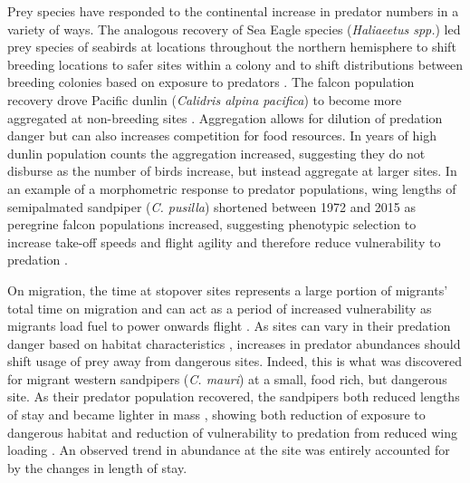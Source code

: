 Prey species have responded to the continental increase in predator numbers in a variety of ways. The analogous recovery of Sea Eagle species (\textit{Haliaeetus spp.}) led prey species of seabirds at locations throughout the northern hemisphere to shift breeding locations to safer sites within a colony and to shift distributions between breeding colonies based on exposure to predators \citep{MarkHipfner2012}. The falcon population recovery drove Pacific dunlin (\textit{Calidris alpina pacifica}) to become more aggregated at non-breeding sites \citep{Xu2015b,Ydenberg2017}. Aggregation allows for dilution of predation danger but can also increases competition for food resources. In years of high dunlin population counts the aggregation increased, suggesting they do not disburse as the number of birds increase, but instead aggregate at larger sites. In an example of a morphometric response to predator populations, wing lengths of semipalmated sandpiper (\textit{C. pusilla}) shortened between 1972 and 2015 as peregrine falcon populations increased, suggesting phenotypic selection to increase take-off speeds and flight agility and therefore reduce vulnerability to predation \citep{Lank2017}.

On migration, the time at stopover sites represents a large portion of migrants' total time on migration \citep{Hedenstrom1997} and can act as a period of increased vulnerability as migrants load fuel to power onwards flight \citep{Houston1998,Cimprich2005a}. As sites can vary in their predation danger based on habitat characteristics \citep{lank_ydenberg2003}, increases in predator abundances should shift usage of prey away from dangerous sites. Indeed, this is what was discovered for migrant western sandpipers (\textit{C. mauri}) at a small, food rich, but dangerous site. As their predator population recovered, the sandpipers both reduced lengths of stay and became lighter in mass \citep{ydenberg_western_2004}, showing both reduction of exposure to dangerous habitat and reduction of vulnerability to predation from reduced wing loading \citep{burns_effects_2002}. An observed trend in abundance at the site was entirely accounted for by the changes in length of stay. 

